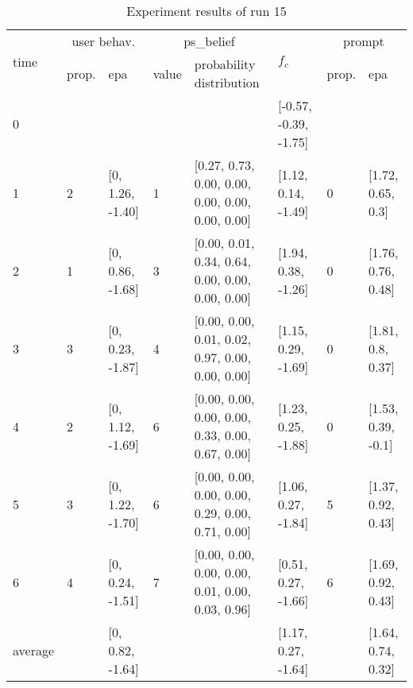\begin{table}[htbp]\footnotesize
\caption{Experiment results of run 15}
\begin{tabular}{|p{0.4cm}|p{0.6cm}|l|p{0.6cm}|p{3.3cm}|l|p{0.6cm}|l|}
\hline

\multirow{2}{*}{time} & \multicolumn{2}{c|}{user behav.} & \multicolumn{2}{c|}{ps\_belief} &
\multirow{2}{*}{$f_c$} & \multicolumn{2}{c|}{prompt} \\ \cline{2-5}\cline{ 7- 8}
& prop. & epa & value & probability distribution &  & prop. & epa \\ \hline

0 & \multicolumn{1}{l|}{} &  & \multicolumn{1}{l|}{} &  & [-0.57, -0.39, -1.75] & \multicolumn{1}{l|}{} &  \\ \hline
1 & 2 & [0, 1.26, -1.40] & 1 & [0.27, 0.73, 0.00, 0.00, 0.00, 0.00, 0.00, 0.00] & [1.12, 0.14, -1.49] & 0 & [1.72, 0.65, 0.3] \\ \hline
2 & 1 & [0, 0.86, -1.68] & 3 & [0.00, 0.01, 0.34, 0.64, 0.00, 0.00, 0.00, 0.00] & [1.94, 0.38, -1.26] & 0 & [1.76, 0.76, 0.48] \\ \hline
3 & 3 & [0, 0.23, -1.87] & 4 & [0.00, 0.00, 0.01, 0.02, 0.97, 0.00, 0.00, 0.00] & [1.15, 0.29, -1.69] & 0 & [1.81, 0.8, 0.37] \\ \hline
4 & 2 & [0, 1.12, -1.69] & 6 & [0.00, 0.00, 0.00, 0.00, 0.33, 0.00, 0.67, 0.00] & [1.23, 0.25, -1.88] & 0 & [1.53, 0.39, -0.1] \\ \hline
5 & 3 & [0, 1.22, -1.70] & 6 & [0.00, 0.00, 0.00, 0.00, 0.29, 0.00, 0.71, 0.00] & [1.06, 0.27, -1.84] & 5 & [1.37, 0.92, 0.43] \\ \hline
6 & 4 & [0, 0.24, -1.51] & 7 & [0.00, 0.00, 0.00, 0.00, 0.01, 0.00, 0.03, 0.96] & [0.51, 0.27, -1.66] & 6 & [1.69, 0.92, 0.43] \\ \hline
\multicolumn{1}{|l|}{average} & \multicolumn{1}{l|}{} & [0, 0.82, -1.64] & \multicolumn{1}{l|}{} &  & [1.17, 0.27, -1.64] & \multicolumn{1}{l|}{} & [1.64, 0.74, 0.32] \\ \hline
\end{tabular}
\label{}
\end{table}


